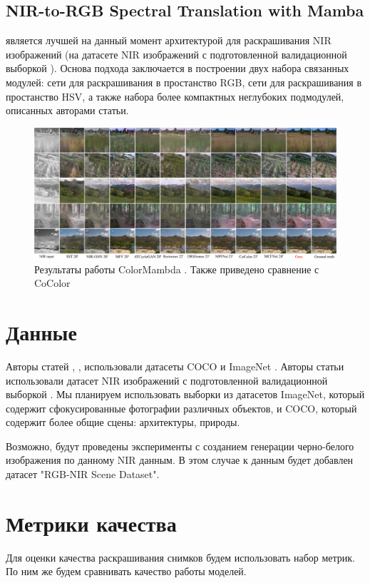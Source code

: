 \documentclass[14pt]{article}
\begin{document}
\subsection{NIR-to-RGB Spectral Translation with Mamba}
\cite{ColorMamba} является лучшей на данный момент архитектурой для раскрашивания NIR изображений (на датасете NIR изображений с подготовленной валидационной выборкой
\cite{VCIP_2020_NIR_dataset}). Основа подхода заключается в построении двух набора связанных модулей: сети для раскрашивания в простанство RGB,
сети для раскрашивания в простанство HSV, а также набора более компактных неглубоких подмодулей, описанных авторами статьи.

\begin{figure}[H]
    \centering
    \includegraphics[width=1.05\textwidth]{resources/performance.pdf}
    \caption{Результаты работы ColorMambda \cite{ColorMamba}. Также приведено сравнение с CoColor \cite{CoColor}}
    \label{fig:id_figura}
\end{figure}


\section{Данные}
Авторы статей \cite{GuidedImageColorization}, \cite{InstaColor}, \cite{CoColor} использовали датасеты COCO \cite{COCO} и ImageNet \cite{ImageNet}.
Авторы статьи \cite{ColorMamba} использовали датасет NIR изображений с подготовленной валидационной выборкой \cite{VCIP_2020_NIR_dataset}.
Мы планируем использовать выборки из датасетов ImageNet, который содержит сфокусированные фотографии различных объектов, и COCO, который
содержит более общие сцены: архитектуры, природы.

Возможно, будут проведены эксперименты с созданием генерации черно-белого изображения по данному NIR данным. В этом случае к данным будет добавлен датасет
"RGB-NIR Scene Dataset".


\section{Метрики качества}
Для оценки качества раскрашивания снимков будем использовать набор метрик. По ним же будем сравнивать качество работы моделей.
\end{document}

